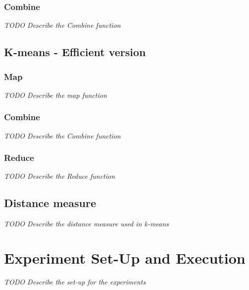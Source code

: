 \subsubsection{Combine}
\textit{TODO Describe the Combine function}

\lipsum[5-6]

\subsection{K-means - Efficient version}
\lipsum[1]

\subsubsection{Map}
\textit{TODO Describe the map function}

\lipsum[1-2]

\subsubsection{Combine}
\textit{TODO Describe the Combine function}

\lipsum[5-6]


\subsubsection{Reduce}
\textit{TODO Describe the Reduce function}

\lipsum[7-8]


\subsection{Distance measure}
\textit{TODO Describe the distance measure used in k-means}

\lipsum[1]


\section{Experiment Set-Up and Execution}
\textit{TODO Describe the set-up for the experiments}

\lipsum[1-3]